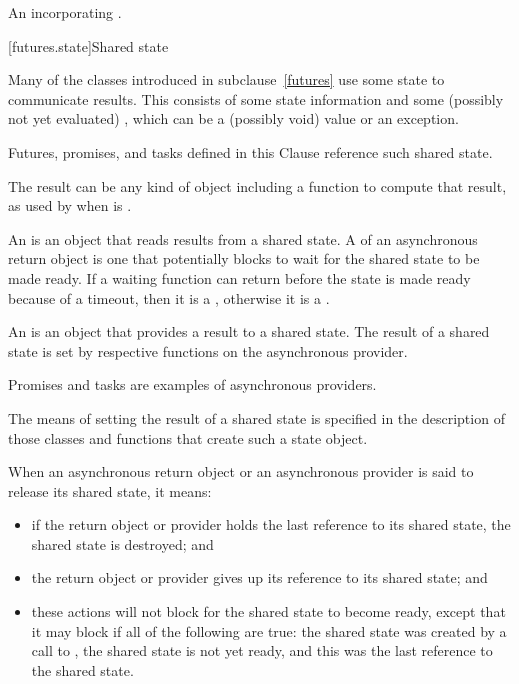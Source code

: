 \begin{itemdescr}
\pnum
\returns
An \ntbs{} incorporating .
\end{itemdescr}

[futures.state]{Shared state}

\pnum
Many of the classes introduced in subclause~\ref{futures} use some state to communicate results. This
 consists of some state information and some (possibly not
yet evaluated) , which can be a (possibly void) value or an exception.
\begin{note}
Futures, promises, and tasks defined in this Clause reference such shared state.
\end{note}

\pnum
\begin{note}
The result can be any kind of object including a function to compute that result,
as used by  when  is .
\end{note}

\pnum
An  is an object that reads results from a
shared state. A  of an asynchronous return object is one
that potentially blocks to wait for the shared state to be made
ready.
If a waiting function can return before the state is made ready because of a
timeout, then it is a , otherwise
it is a .

\pnum
An  is an object that provides a result to a shared
state.
The result of a shared state is set by
respective functions on the asynchronous provider.
\begin{example}
Promises and tasks are examples of asynchronous providers.
\end{example}
The means of setting the result of a shared state is specified
in the description of those classes and functions that create such a state object.

\pnum
When an asynchronous return object or an asynchronous provider is said to release its
shared state, it means:
\begin{itemize}
\item
if the return object or provider holds the last reference to its shared state,
the shared state is destroyed; and

\item
the return object or provider gives up its reference to its shared state; and

\item these actions will not block for the shared state to become ready, except that it
may block if all of the following are true: the shared state was created by a call to
, the shared state is not yet ready, and this was the last reference
to the shared state.
\end{itemize}

